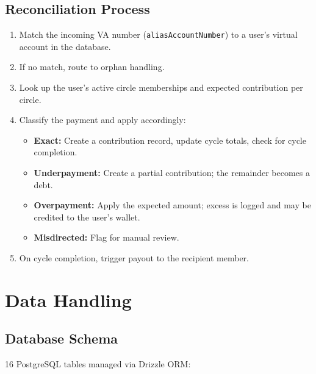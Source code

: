 \documentclass[11pt,a4paper]{article}
\begin{document}
\subsection{Reconciliation Process}

\begin{enumerate}[nosep]
  \item Match the incoming VA number (\texttt{aliasAccountNumber}) to a
        user's virtual account in the database.
  \item If no match, route to orphan handling.
  \item Look up the user's active circle memberships and expected
        contribution per circle.
  \item Classify the payment and apply accordingly:
    \begin{itemize}[nosep]
      \item \textbf{Exact:} Create a contribution record, update cycle
            totals, check for cycle completion.
      \item \textbf{Underpayment:} Create a partial contribution; the
            remainder becomes a debt.
      \item \textbf{Overpayment:} Apply the expected amount; excess is
            logged and may be credited to the user's wallet.
      \item \textbf{Misdirected:} Flag for manual review.
    \end{itemize}
  \item On cycle completion, trigger payout to the recipient member.
\end{enumerate}

\section{Data Handling}

\subsection{Database Schema}

16 PostgreSQL tables managed via Drizzle ORM:
\end{document}
